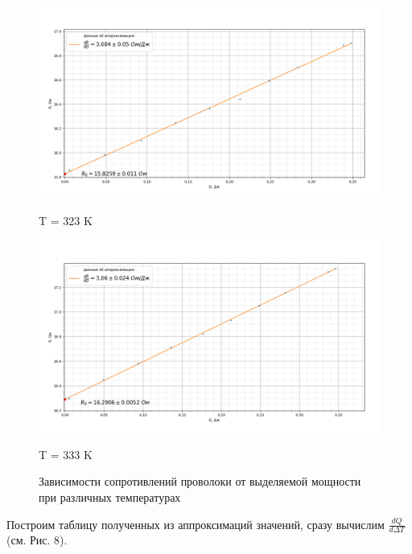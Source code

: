 \documentclass[a4paper, 12pt]{article}%
\begin{document}
\begin{figure}[H]
\begin{center}
\begin{minipage}[h]{0.48\linewidth}
				
			\end{minipage}
		\end{center}
		\begin{center}
			\begin{minipage}[h]{0.48\linewidth}
				\includegraphics[width=1\linewidth]{50_grad}
				\caption{T = 323 K} %
			\end{minipage}
			\hfill
			\begin{minipage}[h]{0.48\linewidth}
				\includegraphics[width=1\linewidth]{60_grad}
				\caption{T = 333 K}
			\end{minipage}
		\end{center}
	\caption*{Зависимости сопротивлений проволоки от выделяемой мощности при различных температурах}
	\end{figure}
	Построим таблицу полученных из аппроксимаций значений, сразу вычислим $\frac{dQ}{d\Delta T}$(см. Рис. 8).
\end{document}
